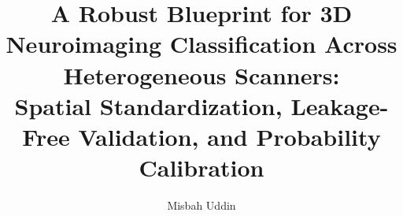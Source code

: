 \title{A Robust Blueprint for 3D Neuroimaging Classification Across Heterogeneous Scanners:\\Spatial Standardization, Leakage-Free Validation, and Probability Calibration}

\author{Misbah Uddin}

